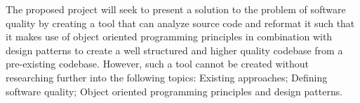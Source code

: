 The proposed project will seek to present a solution to the problem of software quality by creating a tool that can analyze source code and reformat it such that it makes use of object oriented programming principles in combination with design patterns to create a well structured and higher quality codebase from a pre-existing codebase.
However, such a tool cannot be created without researching further into the following topics: Existing approaches; Defining software quality; Object oriented programming principles and design patterns.
